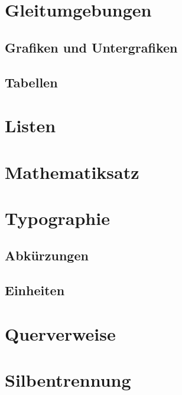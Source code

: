 \documentclass[%
  english,ngerman,%
  geometry=no,DIV=12,automark,%
]{tudscrartcl}
\begin{document}
\section{Gleitumgebungen}
\label{sec:floats}


\subsection{Grafiken und Untergrafiken}
\label{sec:graphics}


\subsection{Tabellen}
\label{sec:tables}


\section{Listen}


\section{Mathematiksatz}


\section{Typographie}

\subsection{Abkürzungen}

\subsection{Einheiten}


\section{Querverweise}


\section{Silbentrennung}
\end{document}
